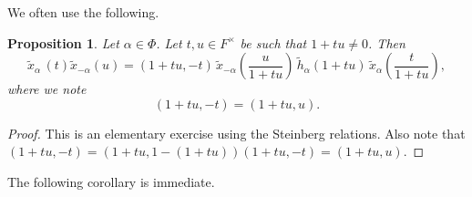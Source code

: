 \documentclass[10pt, letterpaper]{amsart}
\theoremstyle{plain}
\newtheorem{Prop}[equation]{Proposition}
\theoremstyle{definition}
\numberwithin{equation}{section}
\newcommand{\xt}{\tilde{x}}
\newcommand{\htt}{\tilde{h}}
\newcommand{\Gt}{\widetilde{G}}
\newcommand{\Ht}{\widetilde{H}}
\begin{document}
%


We often use the following.

\begin{Prop}\label{PMRootSwap}
Let $\alpha\in \Phi$. Let $t,u\in F^{\times}$ be such that $1+tu\neq 0$. Then
\begin{equation*}
\xt_{\alpha}\,(t)\xt_{-\alpha}(u)=(1+tu,-t)\,\xt_{-\alpha}(\frac{u}{1+tu})\,\htt_{\alpha}(1+tu)\,\xt_{\alpha}(\frac{t}{1+tu}),
\end{equation*}
where we note
\[
(1+tu, -t)=(1+tu, u).
\]
\end{Prop}
\begin{proof}
This is an elementary exercise using the Steinberg relations. Also note that $(1+tu, -t)=(1+tu, 1-(1+tu))(1+tu, -t)=(1+tu, u)$.
\end{proof}

The following corollary is immediate. 
\end{document}
